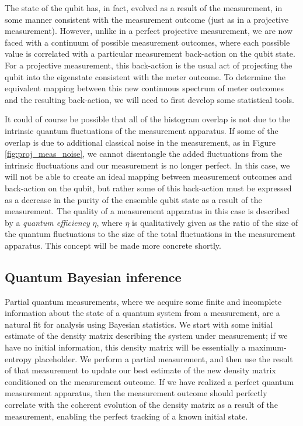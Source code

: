 The state of the qubit has, in fact, evolved as a result of the measurement, in some manner consistent with the measurement outcome (just as in a projective measurement).  However, unlike in a perfect projective measurement, we are now faced with a continuum of possible measurement outcomes, where each possible value is correlated with a particular measurement back-action on the qubit state.  For a projective measurement, this back-action is the usual act of projecting the qubit into the eigenstate consistent with the meter outcome.  To determine the equivalent mapping between this new continuous spectrum of meter outcomes and the resulting back-action, we will need to first develop some statistical tools.

It could of course be possible that all of the histogram overlap is not due to the intrinsic quantum fluctuations of the measurement apparatus.  If some of the overlap is due to additional classical noise in the measurement, as in Figure \ref{fig:proj_meas_noise}, we cannot disentangle the added fluctuations from the intrinsic fluctuations and our measurement is no longer perfect.  In this case, we will not be able to create an ideal mapping between measurement outcomes and back-action on the qubit, but rather some of this back-action must be expressed as a decrease in the purity of the ensemble qubit state as a result of the measurement.  The quality of a measurement apparatus in this case is described by a \textit{quantum efficiency} $\eta$, where $\eta$ is qualitatively given as the ratio of the size of the quantum fluctuations to the size of the total fluctuations in the measurement apparatus.  This concept will be made more concrete shortly.



\subsection{Quantum Bayesian inference}\label{s:bayesian}

Partial quantum measurements, where we acquire some finite and incomplete information about the state of a quantum system from a measurement, are a natural fit for analysis using Bayesian statistics.  We start with some initial estimate of the density matrix describing the system under measurement; if we have no initial information, this density matrix will be essentially a maximum-entropy placeholder.  We perform a partial measurement, and then use the result of that measurement to update our best estimate of the new density matrix conditioned on the measurement outcome.  If we have realized a perfect quantum measurement apparatus, then the measurement outcome should perfectly correlate with the coherent evolution of the density matrix as a result of the measurement, enabling the perfect tracking of a known initial state.

